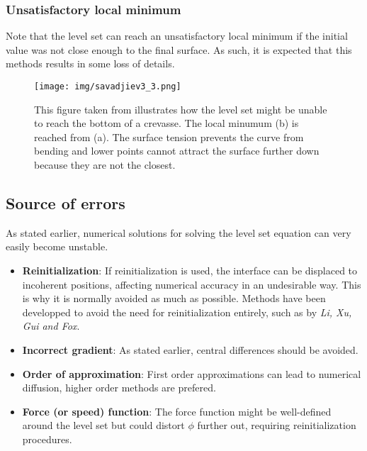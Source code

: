 \documentclass{article}
\begin{document}

\subsubsection{Unsatisfactory local minimum}
\label{localmin}
Note that the level set can reach an unsatisfactory local minimum if the initial
value was not close enough to the final surface. As such, it is expected that
this methods results in some loss of details.

\begin{figure}[H]
  \centering
  \texttt{[image: img/savadjiev3\_3.png]}
  \caption{This figure taken from \cite{savadjiev2003surface} illustrates
  how the level set might be unable to reach the bottom of a crevasse. The local
  minumum (b) is reached from (a). The surface tension prevents the curve from
  bending and lower points cannot attract the surface further down because they
  are not the closest.}    
\end{figure}

\subsection{Source of errors}
As stated earlier, numerical solutions for solving the level set equation can
very easily become unstable.
\begin{itemize}
    \item \textbf{Reinitialization}: If reinitialization is used, the interface
        can be displaced to incoherent positions, affecting numerical accuracy
        in an undesirable way. This is why it is normally avoided as much as
        possible. Methods have been developped to avoid the need for
        reinitialization entirely, such as \cite{li2010distance} by \emph{Li,
        Xu, Gui and Fox}.
    \item \textbf{Incorrect gradient}: As stated earlier, central differences
        should be avoided.
    \item \textbf{Order of approximation}: First order approximations can lead
        to numerical diffusion, higher order methods are prefered.
    \item \textbf{Force (or speed) function}: The force function might be
        well-defined around the level set but could distort $\phi$
        further out, requiring reinitialization procedures. 
\end{itemize}
\end{document}
